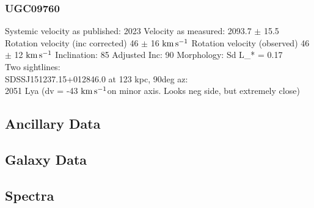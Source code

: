 \documentclass[iop]{emulateapj-rtx4}
\newcommand{\kms}{$\rm km\, s^{-1}$}
\begin{document}
\subsubsection{UGC09760}
Systemic velocity as published: 2023
Velocity as measured: 2093.7 $\pm$ 15.5
Rotation velocity (inc corrected) 46 $\pm$ 16 \kms
Rotation velocity (observed) 46 $\pm$ 12 \kms
Inclination: 85
Adjusted Inc: 90
Morphology: Sd
L_{\**} = 0.17 \\

Two sightlines: \\
SDSSJ151237.15+012846.0 at 123 kpc, 90deg az: \\
2051 Lya (dv = -43 \kms on minor axis. Looks neg side, but extremely close)



\subsection{Ancillary Data}


\subsection{Galaxy Data}







\subsection{Spectra}
\end{document}
